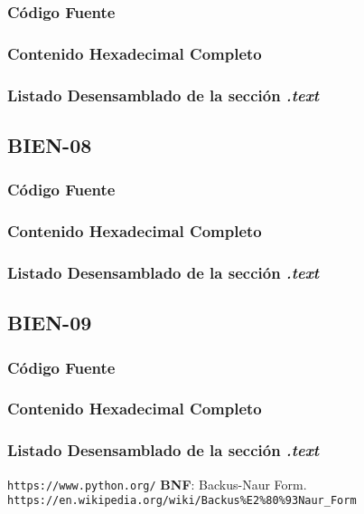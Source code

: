 \documentclass[a4paper,12pt]{article}
\begin{document}
\subsubsection{Código Fuente}

\subsubsection{Contenido Hexadecimal Completo}
\subsubsection{Listado Desensamblado de la sección \textit{.text}}


\subsection{BIEN-08}
\subsubsection{Código Fuente}

\subsubsection{Contenido Hexadecimal Completo}
\subsubsection{Listado Desensamblado de la sección \textit{.text}}


\subsection{BIEN-09}
\subsubsection{Código Fuente}

\subsubsection{Contenido Hexadecimal Completo}
\subsubsection{Listado Desensamblado de la sección \textit{.text}}

\begin{thebibliography}{10}
 \texttt{https://www.python.org/}
 \textbf{BNF}: Backus-Naur Form. \texttt{https://en.wikipedia.org/wiki/Backus\%E2\%80\%93Naur\_Form}
\end{thebibliography}
\end{document}
